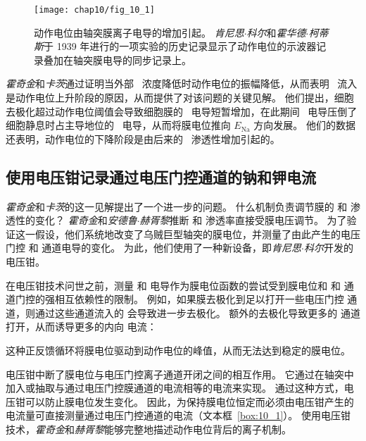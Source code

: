 \begin{figure}[htbp]
	\centering
	\texttt{[image: chap10/fig\_10\_1]}
	\caption{动作电位由轴突膜离子电导的增加引起。
		\textit{肯尼思$\cdot$科尔}和\textit{霍华德$\cdot$柯蒂斯}于 1939 年进行的一项实验的历史记录显示了动作电位的示波器记录叠加在轴突膜电导的同步记录上。}
	\label{fig:10_1}
\end{figure}


\textit{霍奇金}和\textit{卡茨}通过证明当外部~ 浓度降低时动作电位的振幅降低，从而表明~ 流入是动作电位上升阶段的原因，从而提供了对该问题的关键见解。
他们提出，细胞去极化超过动作电位阈值会导致细胞膜的~ 电导短暂增加，在此期间~ 电导压倒了细胞静息时占主导地位的~ 电导，从而将膜电位推向 $E_{\text{Na}}$ 方向发展。
他们的数据还表明，动作电位的下降阶段是由后来的~ 渗透性增加引起的。



\subsection{使用电压钳记录通过电压门控通道的钠和钾电流}

\textit{霍奇金}和\textit{卡茨}的这一见解提出了一个进一步的问题。
什么机制负责调节膜的  和  渗透性的变化？
\textit{霍奇金}和\textit{安德鲁$\cdot$赫胥黎}推断  和  渗透率直接受膜电压调节。
为了验证这一假设，他们系统地改变了乌贼巨型轴突的膜电位，并测量了由此产生的电压门控  和  通道电导的变化。
为此，他们使用了一种新设备，即\textit{肯尼思$\cdot$科尔}开发的电压钳。



在电压钳技术问世之前，测量  和  电导作为膜电位函数的尝试受到膜电位和  和  通道门控的强相互依赖性的限制。
例如，如果膜去极化到足以打开一些电压门控  通道，则通过这些通道流入的  会导致进一步去极化。 
额外的去极化导致更多的  通道打开，从而诱导更多的内向  电流：


这种正反馈循环将膜电位驱动到动作电位的峰值，从而无法达到稳定的膜电位。


电压钳中断了膜电位与电压门控离子通道开闭之间的相互作用。
它通过在轴突中加入或抽取与通过电压门控膜通道的电流相等的电流来实现。
通过这种方式，电压钳可以防止膜电位发生变化。
因此，为保持膜电位恒定而必须由电压钳产生的电流量可直接测量通过电压门控通道的电流（文本框~\ref{box:10_1}）。
使用电压钳技术，\textit{霍奇金}和\textit{赫胥黎}能够完整地描述动作电位背后的离子机制。


